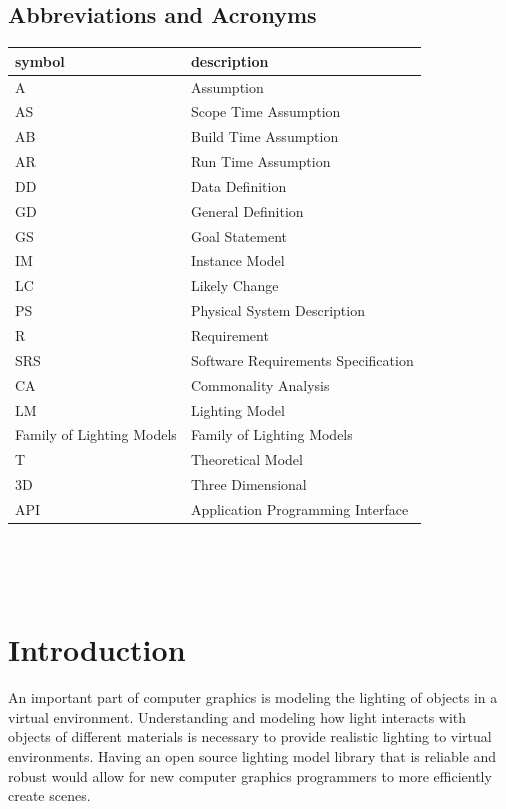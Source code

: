 \documentclass[12pt]{article}
\newcommand{\famname}{Family of Lighting Models} %
\begin{document}
\subsection{Abbreviations and Acronyms}

\renewcommand{\arraystretch}{1.2}
\begin{tabular}{l l} 
  \toprule		
  \textbf{symbol} & \textbf{description}\\
  \midrule 
  A & Assumption\\
  AS & Scope Time Assumption \\
  AB & Build Time Assumption \\
  AR & Run Time Assumption \\
  DD & Data Definition\\
  GD & General Definition\\
  GS & Goal Statement\\
  IM & Instance Model\\
  LC & Likely Change\\
  PS & Physical System Description\\
  R & Requirement\\
  SRS & Software Requirements Specification\\
  CA & Commonality Analysis \\
  LM & Lighting Model\\
  \famname{} & \famname{}\\
  T & Theoretical Model\\
  3D & Three Dimensional \\
  API & Application Programming Interface \\
  \bottomrule
\end{tabular}\\


\newpage

\tableofcontents

~\newpage


\section{Introduction}
An important part of computer graphics is modeling the lighting 
of objects in a virtual environment. Understanding and modeling how light 
interacts with objects of different materials is necessary to provide realistic 
lighting to virtual environments. Having an open source lighting model library 
that is reliable and robust would allow for new computer graphics programmers 
to more efficiently create scenes.
\end{document}
